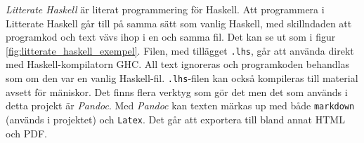 \begin{draft}
\textit{Litterate Haskell} är literat programmering för Haskell.\cite{litterate_haskell}
Att programmera i Litterate Haskell går till på samma sätt som vanlig Haskell,
med skillndaden att programkod och text vävs ihop i en och samma fil. Det kan
se ut som i figur \ref{fig:litterate_haskell_exempel}. Filen, med tillägget
\texttt{.lhs}, går att använda direkt med Haskell-kompilatorn GHC. All text
ignoreras och programkoden behandlas som om den var en vanlig
Haskell-fil. \texttt{.lhs}-filen kan också kompileras till material avsett för
mäniskor. Det finns flera verktyg som gör det men det som används i detta
projekt är \textit{Pandoc}\cite{pandoc}. Med \textit{Pandoc} kan texten märkas
up med både \texttt{markdown} (används i projektet) och \texttt{Latex}. Det går
att exportera till bland annat HTML och PDF.
\end{draft}

